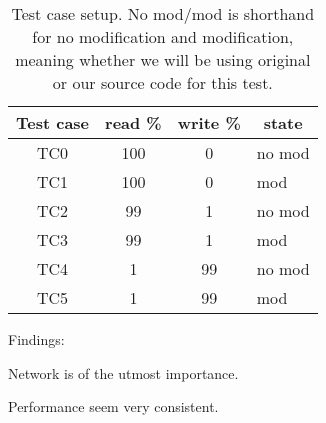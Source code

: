\begin{center}
\begin{table}[h]
	\begin{tabular}{|c|c|c|l|}
		\multicolumn{1}{c}{Test case} & 
		\multicolumn{1}{c}{read \%} & 
		\multicolumn{1}{c}{write \%} & 
		\multicolumn{1}{c}{state} \\
		\hline

		TC0 & 100 & 0 & no mod \\
		TC1 & 100 & 0 & mod \\
		TC2 & 99 & 1 & no mod \\
		TC3 & 99 & 1 & mod \\
		TC4 & 1 & 99 & no mod \\
		TC5 & 1 & 99 & mod \\

		\hline
	\end{tabular}
	\caption{Test case setup. No mod/mod is shorthand for no modification and modification, meaning whether we will be using original or our source code for this test.}
	\label{tbl:testcases}
\end{table}
\end{center}

Findings:

Network is of the utmost importance.

Performance seem very consistent.
